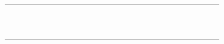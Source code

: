 \documentclass[10pt]{article}
\begin{document}
\begin{center}
\begin{tabular}{|c|c|c|c|c|c|c|c|c|c|c|c|c|c|c|c|c|c|c|c|c|c|c|c|c|c|}
\hline
 &  &  &  &  &  &  &  &  &  &  &  &  &  &  &  &  &  &  &  &  &  &  &  &  &  \\
\hline
 &  &  &  &  &  &  &  &  &  &  &  &  &  &  &  &  &  &  &  &  &  &  &  &  &  \\
\hline
 &  &  &  &  &  &  &  &  &  &  &  &  &  &  &  &  &  &  &  &  &  &  &  &  &  \\
\hline
 &  &  &  &  &  &  &  &  &  &  &  &  &  &  &  &  &  &  &  &  &  &  &  &  &  \\
\hline
 &  &  &  &  &  &  &  &  &  &  &  &  &  &  &  &  &  &  &  &  &  &  &  &  &  \\
\hline
 &  &  &  &  &  &  &  &  &  &  &  &  &  &  &  &  &  &  &  &  &  &  &  &  &  \\
\hline
 &  &  &  &  &  &  &  &  &  &  &  &  &  &  &  &  &  &  &  &  &  &  &  &  &  \\
\hline
 &  &  &  &  &  &  &  &  &  &  &  &  &  &  &  &  &  &  &  &  &  &  &  &  &  \\
\hline
 &  &  &  &  &  &  &  &  &  &  &  &  &  &  &  &  &  &  &  &  &  &  &  &  &  \\
\hline
 &  &  &  &  &  &  &  &  &  &  &  &  &  &  &  &  &  &  &  &  &  &  &  &  &  \\
\hline
 &  &  &  &  &  &  &  &  &  &  &  &  &  &  &  &  &  &  &  &  &  &  &  &  &  \\
\hline
 &  &  &  &  &  &  &  &  &  &  &  &  &  &  &  &  &  &  &  &  &  &  &  &  &  \\
\hline
\end{tabular}
\end{center}
\end{document}
